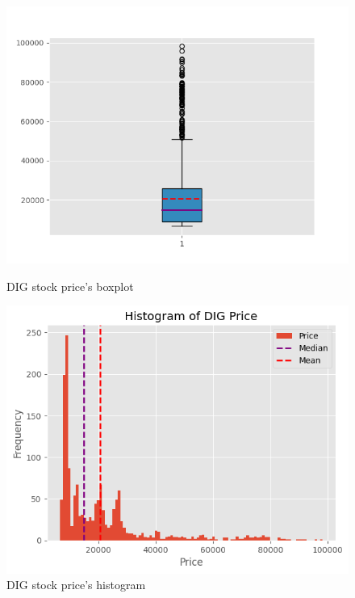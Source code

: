 \documentclass[conference]{IEEEtran}
\begin{document}
\begin{figure}[htbp]
    \vspace{0.5cm} %

    \begin{minipage}{0.23\textwidth}
    \centering
    \includegraphics[width=1\textwidth]{Boxplot_DIG.png}
    \caption{DIG stock price's boxplot}
    \label{fig:dig_boxplot}
    \end{minipage}
    \hfill
    \begin{minipage}{0.23\textwidth}
    \centering
    \includegraphics[width=1\textwidth]{Histogram DIG.png}
    \caption{DIG stock price's histogram}
    \label{fig:dig_histogram}
    \end{minipage}


\end{figure}
\end{document}
